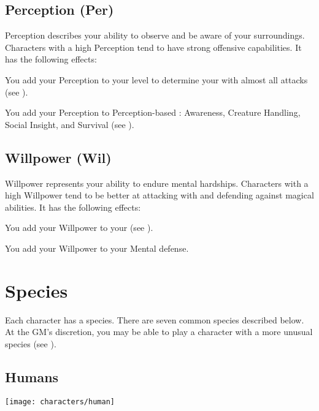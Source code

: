     \subsection{Perception (Per)}\label{Perception}
        {
            Perception describes your ability to observe and be aware of your surroundings.
            Characters with a high Perception tend to have strong offensive capabilities.
            It has the following effects:
            \begin{raggeditemize}
                \item You add your Perception to your level to determine your  with almost all attacks (see ).
                \item You add your Perception to Perception-based : Awareness, Creature Handling, Social Insight, and Survival (see ).
            \end{raggeditemize}
        }

    \subsection{Willpower (Wil)}\label{Willpower}
        {
            Willpower represents your ability to endure mental hardships.
            Characters with a high Willpower tend to be better at attacking with and defending against magical abilities.
            It has the following effects:
            \begin{raggeditemize}
                \item You add your Willpower to your  (see ).
                \item You add your Willpower to your Mental defense.
            \end{raggeditemize}
        }

\section{Species}\label{Species}
    Each character has a species.
    There are seven common species described below.
    At the GM's discretion, you may be able to play a character with a more unusual species (see ).

    \subsection{Humans}
        \texttt{[image: characters/human]}

